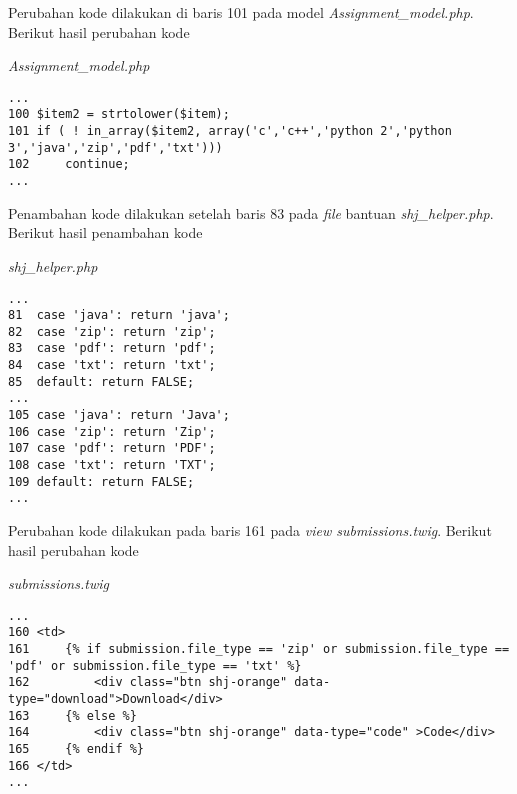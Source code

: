 Perubahan kode dilakukan di baris 101 pada model \textit{Assignment\_model.php}. Berikut hasil perubahan kode 

\textit{Assignment\_model.php}
\begin{lstlisting}[basicstyle=\ttfamily, frame=single,
columns=fullflexible, keepspaces=true, breaklines=true]
...
100	$item2 = strtolower($item);
101	if ( ! in_array($item2, array('c','c++','python 2','python 3','java','zip','pdf','txt')))
102		continue;
...
\end{lstlisting}

Penambahan kode dilakukan setelah baris 83 pada \textit{file} bantuan \textit{shj\_helper.php}. Berikut hasil penambahan kode 

\textit{shj\_helper.php}
\begin{lstlisting}[basicstyle=\ttfamily, frame=single,
columns=fullflexible, keepspaces=true, breaklines=true]
...
81	case 'java': return 'java';
82	case 'zip': return 'zip';
83	case 'pdf': return 'pdf';
84	case 'txt': return 'txt';
85	default: return FALSE;
...
105	case 'java': return 'Java';
106	case 'zip': return 'Zip';
107	case 'pdf': return 'PDF';
108	case 'txt': return 'TXT';
109	default: return FALSE;
...
\end{lstlisting}

Perubahan kode dilakukan pada baris 161 pada \textit{view submissions.twig}. Berikut hasil perubahan kode

\textit{submissions.twig}
\begin{lstlisting}[basicstyle=\ttfamily, frame=single,
columns=fullflexible, keepspaces=true, breaklines=true]
...
160	<td>
161		{% if submission.file_type == 'zip' or submission.file_type == 'pdf' or submission.file_type == 'txt' %}
162			<div class="btn shj-orange" data-type="download">Download</div>
163		{% else %}
164			<div class="btn shj-orange" data-type="code" >Code</div>
165		{% endif %}
166	</td>
...
\end{lstlisting}

